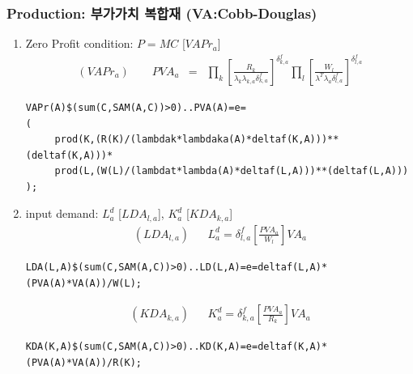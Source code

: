 \documentclass[10pt,compress,slidetop,%
			   hyperref={unicode},xcolor={svgnames},%
			   t]{beamer}
\begin{document}
\begin{frame}[fragile]
\frametitle{Production: 부가가치 복합재 (VA:Cobb-Douglas)}
\begin{scriptsize}
\begin{enumerate}
\item{Zero Profit condition: $P=MC$ [$VAPr_a$]}
\begin{eqnarray*}
(VAPr_a)\qquad PVA_a&=&\prod_k\left[\frac{R_k}{\lambda_k\lambda_{k,a}\delta^f_{k,a}}\right]^{\delta^f_{k,a}}
\prod_l\left[\frac{W_l}{\lambda^T\lambda_a\delta^f_{l,a}}\right]^{\delta^f_{l,a}}
\end{eqnarray*}

\begin{verbatim}
VAPr(A)$(sum(C,SAM(A,C))>0)..PVA(A)=e=
(
     prod(K,(R(K)/(lambdak*lambdaka(A)*deltaf(K,A)))**(deltaf(K,A)))*
     prod(L,(W(L)/(lambdat*lambda(A)*deltaf(L,A)))**(deltaf(L,A)))
);
\end{verbatim}
\item{input demand: $L^d_a$ [$LDA_{l,a}$], $K^d_a$ [$KDA_{k,a}$]}
\begin{eqnarray*}
(LDA_{l,a})& &L^d_a=\delta^f_{l,a}\left[\frac{PVA_a}{W_l}\right]VA_a
\end{eqnarray*}

\begin{verbatim} 
LDA(L,A)$(sum(C,SAM(A,C))>0)..LD(L,A)=e=deltaf(L,A)*(PVA(A)*VA(A))/W(L);
\end{verbatim}

\begin{eqnarray*}
(KDA_{k,a})& &K^d_a=\delta^f_{k,a}\left[\frac{PVA_a}{R_k}\right]VA_a
\end{eqnarray*}

\begin{verbatim} 
KDA(K,A)$(sum(C,SAM(A,C))>0)..KD(K,A)=e=deltaf(K,A)*(PVA(A)*VA(A))/R(K);
\end{verbatim}
   
\end{enumerate}
\end{scriptsize}
\end{frame}
\end{document}
